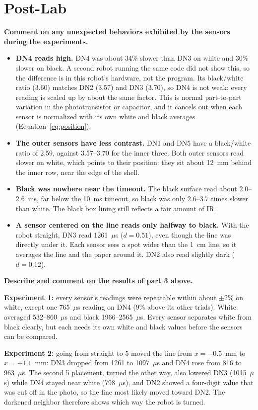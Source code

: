 \documentclass[11pt]{article}
\newcommand{\question}[1]{\par\medskip\noindent\textbf{#1}\par\noindent\ignorespaces}
\begin{document}
\section{Post-Lab}
\question{Comment on any unexpected behaviors exhibited by the sensors during the experiments.}
\begin{itemize}
\item \textbf{DN4 reads high.} DN4 was about 34\% slower than DN3 on white and 30\% slower on black. A second robot running the same code did not show this, so the difference is in this robot's hardware, not the program. Its black/white ratio (3.60) matches DN2 (3.57) and DN3 (3.70), so DN4 is not weak; every reading is scaled up by about the same factor. This is normal part-to-part variation in the phototransistor or capacitor, and it cancels out when each sensor is normalized with its own white and black averages (Equation~\ref{eq:position}).
\item \textbf{The outer sensors have less contrast.} DN1 and DN5 have a black/white ratio of 2.59, against 3.57--3.70 for the inner three. Both outer sensors read slower on white, which points to their position: they sit about 12~mm behind the inner row, near the edge of the shell.
\item \textbf{Black was nowhere near the timeout.} The black surface read about 2.0--2.6~ms, far below the 10~ms timeout, so black was only 2.6--3.7 times slower than white. The black box lining still reflects a fair amount of IR.
\item \textbf{A sensor centered on the line reads only halfway to black.} With the robot straight, DN3 read 1261~$\mu$s ($d = 0.51$), even though the line was directly under it. Each sensor sees a spot wider than the 1~cm line, so it averages the line and the paper around it. DN2 also read slightly dark ($d = 0.12$).
\end{itemize}

\question{Describe and comment on the results of part 3 above.}
\textbf{Experiment 1:} every sensor's readings were repeatable within about $\pm$2\% on white, except one 765~$\mu$s reading on DN4 (9\% above its other trials). White averaged 532--860~$\mu$s and black 1966--2565~$\mu$s. Every sensor separates white from black clearly, but each needs its own white and black values before the sensors can be compared.

\textbf{Experiment 2:} going from straight to 5\textdegree{} moved the line from $x = -0.5$~mm to $x = +1.1$~mm: DN3 dropped from 1261 to 1097~$\mu$s and DN4 rose from 816 to 963~$\mu$s. The second 5\textdegree{} placement, turned the other way, also lowered DN3 (1015~$\mu$s) while DN4 stayed near white (798~$\mu$s), and DN2 showed a four-digit value that was cut off in the photo, so the line most likely moved toward DN2. The darkened neighbor therefore shows which way the robot is turned.
\end{document}
